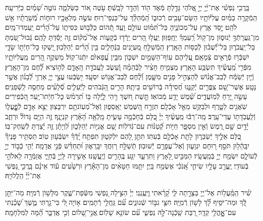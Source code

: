 \documentclass[twoside, openany, parskip=half, 11pt]{book}
\begin{document}
בָּֽרֲכִ֥י נַפְשִׁ֗י אֶת־יְ֫יָ֥ יְיָ֣ אֱ֭לֹהַי גָּדַ֣לְתָּ מְּֿאֹ֑ד ה֖וֹד וְֿהָדָ֣ר לָבָֽשְֿׁתָּ׃ עֹ֣טֶה א֭וֹר כַּשַּׂלְמָ֑ה נוֹטֶ֣ה שָׁ֝מַ֗יִם כַּיְּֿרִיעָֽה׃ הַֽמְֿקָרֶ֥ה בַמַּ֗יִם עֲלִיּ֫וֹתָ֥יו הַשָּׂם־עָבִ֥ים רְֿכוּב֑וֹ הַֽ֝מְֿהַלֵּ֗ךְ עַל־כַּנְפֵי־רֽוּחַ׃ עֹשֶׂ֣ה מַלְאָכָ֣יו רוּח֑וֹת מְֿ֝שָׁרֲתָ֗יו אֵ֣שׁ לֹהֵֽט׃ יָ֣סַד אֶ֖רֶץ עַל־מְכוֹנֶ֑יהָ בַּל־תִּ֝מּ֗וֹט עוֹלָ֥ם וָעֶֽד׃ תְּֿ֭הוֹם כַּלְּֿב֣וּשׁ כִּסִּית֑וֹ עַל־הָ֝רִ֗ים יַֽעַמְדוּ־מָֽיִם׃ מִן־גַּֽעֲרָתְֿךָ֥ יְֿנוּס֑וּן מִן־ק֥וֹל רַֽ֝עַמְךָ֗ יֵחָֽפֵזֽוּן׃ יַֽעֲל֣וּ הָ֭רִים יֵֽרְֿד֣וּ בְֿקָע֑וֹת אֶל־מְ֝ק֗וֹם זֶ֤ה יָסַ֬דְתָּ לָהֶֽם׃ גְּֽֿבוּל־שַׂ֭מְתָּ בַּל־יַֽעֲבֹר֑וּן בַּל־יְֿ֝שֻׁב֗וּן לְֿכַסּ֥וֹת הָאָֽרֶץ׃ הַֽמְֿשַׁלֵּ֣חַ מַ֭עְיָנִים בַּנְּֿחָלִ֑ים בֵּ֥ין הָ֝רִ֗ים יְֿהַלֵּכֽוּן׃ יַ֭שְׁקוּ כׇּל־חַיְֿת֣וֹ שָׂדָ֑י יִשְׁבְּֿר֖וּ פְֿרָאִ֣ים צְֿמָאָֽם׃ עֲ֭לֵיהֶם עֽוֹף־הַשָּׁמַ֣יִם יִשְׁכּ֑וֹן מִבֵּ֥ין עֳ֝פָאיִ֗ם יִתְּֿנוּ־קֽוֹל׃ מַשְׁקֶ֣ה הָ֭רִים מֵֽעֲלִיּוֹתָ֑יו מִפְּֿרִ֥י מַֽ֝עֲשֶׂ֗יךָ תִּשְׂבַּ֥ע הָאָֽרֶץ׃ מַצְמִ֤יחַ חָצִ֨יר לַבְּֿהֵמָ֗ה וְֿ֭עֵשֶׂב לַֽעֲבֹדַ֣ת הָֽאָדָ֑ם לְֿה֥וֹצִיא לֶ֝֗חֶם מִן־הָאָֽרֶץ׃ וְֿיַ֤יִן יְֿשַׂמַּ֬ח לְֽֿבַב־אֱנ֗וֹשׁ לְֿהַצְהִ֣יל פָּנִ֣ים מִשָּׁ֑מֶן וְֿ֝לֶ֗חֶם לְֿבַב־אֱנ֥וֹשׁ יִסְעָֽד׃ יִ֭שְׂבְּֿעוּ עֲצֵ֣י יְיָ֑ אַרְזֵ֥י לְֿ֝בָנ֗וֹן אֲשֶׁ֣ר נָטָֽע׃ אֲשֶׁר־שָׁ֭ם צִֽפֳּרִ֣ים יְֿקַנֵּ֑נוּ חֲ֝סִידָ֗ה בְּֿרוֹשִׁ֥ים בֵּיתָֽהּ׃ הָרִ֣ים הַ֭גְּֿבֹהִים לַיְּֿעֵלִ֑ים סְֿ֝לָעִ֗ים מַחְסֶ֥ה לַֽשְֿׁפַנִּֽים׃ עָשָׂ֣ה יָ֭רֵחַ לְֿמֽוֹעֲדִ֑ים שֶׁ֝֗מֶשׁ יָדַ֥ע מְֿבוֹאֽוֹ׃ תָּ֣שֶׁת ח֭שֶׁךְ וִ֣יהִי לָ֑יְֿלָה בּ֥וֹ תִ֝רְמֹ֗שׂ כׇּל־חַיְֿתוֹ־יָֽעַר׃ הַ֭כְּֿפִירִים שֹֽׁאֲגִ֣ים לַטָּ֑רֶף וּלְבַקֵּ֖שׁ מֵאֵ֣ל אָכְֿלָֽם׃ תִּזְרַ֣ח הַ֭שֶּׁמֶשׁ יֵאָֽסֵפ֑וּן וְֿאֶל־מְ֝עֽוֹנֹתָ֥ם יִרְבָּצֽוּן׃ יֵצֵ֣א אָדָ֣ם לְֿפׇׇׇׇׇָֽעֳל֑וֹ וְֿלַֽעֲבֹֽדָת֥וֹ עֲדֵי־עָֽרֶב׃ מָֽה־רַבּ֬וּ מַֽעֲשֶׂ֨יךָ יְיָ֗ כֻּ֭לָּם בְּֿחָכְֿמָ֣ה עָשִׂ֑יתָ מָֽלְֿאָ֥ה הָ֝אָ֗רֶץ קִנְיָנֶֽךָ׃ זֶ֤ה הַיָּ֥ם גָּדוֹל֘ וּרְחַ֢ב יָ֫דָ֥יִם שָׁ֣ם רֶ֭מֶשׂ וְֿאֵ֣ין מִסְפָּ֑ר חַיּ֥וֹת קְֿ֝טַנּ֗וֹת עִם־גְּֿדֹלֽוֹת׃ שָׁ֭ם אֳנִיּ֣וֹת יְֿהַלֵּכ֑וּן לִ֝וְיָתָ֗ן זֶ֤ה יָ֬צַרְתָּ לְֿשַֽׂחֶק־בּֽוֹ׃ כֻּ֭לָּם אֵלֶ֣יךָ יְֿשַׂבֵּר֑וּן לָתֵ֖ת אָכְֿלָ֣ם בְּֿעִתּֽוֹ׃ תִּתֵּ֣ן לָ֭הֶם יִלְקֹט֑וּן תִּפְתַּ֥ח יָֽ֝דְֿךָ֗ יִשְׂבְּֿע֥וּן טֽוֹב׃ תַּסְתִּ֥יר פָּנֶיךָ֘ יִבָּֽהֵ֫ל֥וּן תֹּסֵ֣ף ר֭וּחָם יִגְוָע֑וּן וְֽֿאֶל־עֲפָרָ֥ם יְֿשׁוּבֽוּן׃ תְּֿשַׁלַּ֣ח ר֭וּֽחֲךָ יִבָּֽרֵא֑וּן וּ֝תְחַדֵּ֗שׁ פְּֿנֵ֣י אֲדָמָֽה׃ יְֿהִ֤י כְֿב֣וֹד יְיָ֣ לְֿעוֹלָ֑ם יִשְׂמַ֖ח יְיָ֣ בְּֿמַֽעֲשָֽׂיו׃ הַמַּבִּ֣יט לָ֭אָרֶץ וַתִּרְעָ֑ד יִגַּ֖ע בֶּֽהָרִ֣ים וְֿיֶֽעֱשָֽׁנוּ׃ אָשִׁ֣ירָה לַּֽיְיָ֣ בְּֿחַיָּ֑י אֲזַמְּֿרָ֖ה לֵֽאלֹהַ֣י בְּֿעוֹדִֽי׃ יֶֽעֱרַ֣ב עָלָ֣יו שִׂיחִ֑י אָֽ֝נֹכִ֗י אֶשְׂמַ֥ח בַּֽיְיָ׃ יִתַּ֤מּוּ חַטָּאִ֨ים מִן־הָאָ֡רֶץ וּרְשָׁ֙עִים ע֬וֹד אֵינָ֗ם בָּֽרֲכִ֣י נַ֭פְשִׁי אֶת־יְ֜יָ֗ הַֽלֲלוּיָֽהּ׃

שִׁ֗יר הַֽמַּֽ֫עֲל֥וֹת אֶל־יְ֖יָ בַּצָּרָ֣תָה לִּ֑י קָ֝רָ֗אתִי ֽוַיַּֽעֲנֵֽנִי׃ יְיָ֗ הַצִּ֣ילָה נַ֭פְשִׁי מִשְּֿׂפַת־שֶׁ֑קֶר מִלָּשׁ֥וֹן רְֿמִיָּֽה׃ מַה־יִּתֵּ֣ן לְֿ֭ךָ וּמַה־יֹּסִ֥יף לָ֝֗ךְ לָשׁ֥וֹן רְֿמִיָּֽה׃ חִצֵּ֣י גִבּ֣וֹר שְֿׁנוּנִ֑ים עִ֝֗ם גַּֽחֲלֵ֥י רְֿתָמִֽים׃ א֣וֹיָה ֖לִּי כִּי־גַ֣רְתִּי מֶ֑שֶׁךְ שָׁ֝כַ֗נְתִּי עִם־אׇׇׇׇׇׇָֽהֳלֵ֥י קֵדָֽר׃ רַ֭בַּת שָֽׁכְֿנָה־לָּ֣הּ נַפְשִׁ֑י עִ֝֗ם שׂוֹנֵ֥א שָׁלֽוֹם׃ ֽאֲנִ֣י־שָׁ֭לוֹם וְֿכִ֣י אֲדַבֵּ֑ר הֵ֝֗מָּה לַמִּלְחָמָֽה׃
\end{document}
